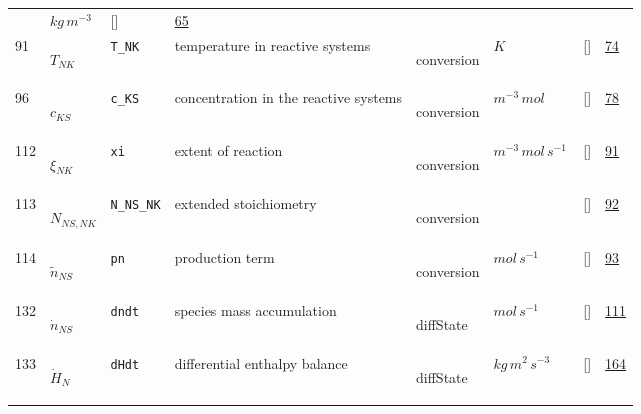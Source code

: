 \begin{longtable}{|p{1cm}|p{3cm}|p{3cm}|p{7cm}|p{3.0cm}|p{3cm}|p{2cm}|p{1cm}|}
             & $ kg \,m^{-3} \, $
             & []
             & \hyperlink{"e:65"}{ 65 }
                 \\
    91
             & \hypertarget{"v:91"}{ $ {T}{_{{N K}}} $}
             & \verb|T_NK|
             & temperature in reactive systems
             & \begin{lay}conversion \end{lay}
             & $ K \, $
             & []
             & \hyperlink{"e:74"}{ 74 }
                 \\
    96
             & \hypertarget{"v:96"}{ $ {c}{_{{K S}}} $}
             & \verb|c_KS|
             & concentration in the reactive systems
             & \begin{lay}conversion \end{lay}
             & $ m^{-3} \,mol \, $
             & []
             & \hyperlink{"e:78"}{ 78 }
                 \\
    112
             & \hypertarget{"v:112"}{ $ {\xi}{_{{N K}}} $}
             & \verb|xi|
             & extent of reaction
             & \begin{lay}conversion \end{lay}
             & $ m^{-3} \,mol \,s^{-1} \, $
             & []
             & \hyperlink{"e:91"}{ 91 }
                 \\
    113
             & \hypertarget{"v:113"}{ $ {N}{_{{N S}, {N K}}} $}
             & \verb|N_NS_NK|
             & extended stoichiometry
             & \begin{lay}conversion \end{lay}
             & $  $
             & []
             & \hyperlink{"e:92"}{ 92 }
                 \\
    114
             & \hypertarget{"v:114"}{ $ {\tilde{n}}{_{{N S}}} $}
             & \verb|pn|
             & production term
             & \begin{lay}conversion \end{lay}
             & $ mol \,s^{-1} \, $
             & []
             & \hyperlink{"e:93"}{ 93 }
                 \\
    132
             & \hypertarget{"v:132"}{ $ {\dot{n}}{_{{N S}}} $}
             & \verb|dndt|
             & species mass accumulation
             & \begin{lay}diffState \end{lay}
             & $ mol \,s^{-1} \, $
             & []
             & \hyperlink{"e:111"}{ 111 }
                 \\
    133
             & \hypertarget{"v:133"}{ $ {\dot{H}}{_{N}} $}
             & \verb|dHdt|
             & differential enthalpy balance
             & \begin{lay}diffState \end{lay}
             & $ kg \,m^{2} \,s^{-3} \, $
             & []
             & \hyperlink{"e:164"}{ 164 }
                 \\
    \end{longtable}